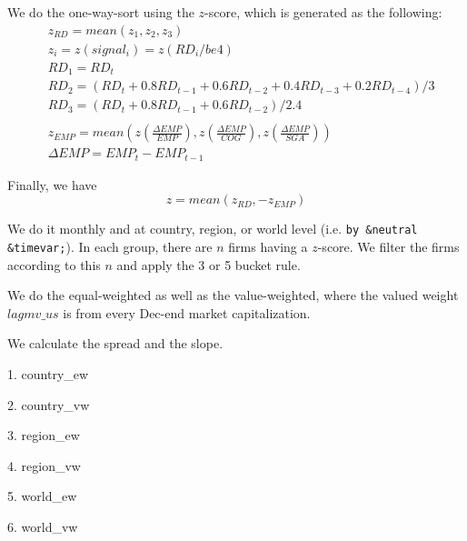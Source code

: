 





\thispagestyle{fancy}

\newcommand{\code}{\texttt}
\newcommand*{\Commonpath}{20181207/new/be4}
{}

We do the one-way-sort using the $z$-score, which is generated as the following:
$$
\begin{aligned}
& z_{RD} = mean(z_1, z_2, z_3) \\
& z_i = z(signal_i) = z(RD_i/be4) \\
& RD_1 = RD_t \\
& RD_2 = (RD_t + 0.8RD_{t-1} + 0.6RD_{t-2} + 0.4RD_{t-3} + 0.2RD_{t-4})/3 \\
& RD_3 = (RD_t + 0.8RD_{t-1} + 0.6RD_{t-2})/2.4 \\
& \\
& z_{EMP} = mean(z(\frac{\Delta EMP}{EMP}), z(\frac{\Delta EMP}{COG}), z(\frac{\Delta EMP}{SGA})) \\
& \Delta EMP = EMP_t - EMP_{t-1}
\end{aligned}
$$

Finally, we have
$$
z = mean(z_{RD}, -z_{EMP})
$$


We do it monthly and at country, region, or world level (i.e. \code{by \&neutral \&timevar;}). In each group, there are $n$ firms having a $z$-score. We filter the firms according to this $n$ and apply the 3 or 5 bucket rule.

We do the equal-weighted as well as the value-weighted, where the valued weight $lagmv\_us$ is from every Dec-end market capitalization.

We calculate the spread and the slope.

1. country\_ew


2. country\_vw


3. region\_ew


4. region\_vw


5. world\_ew


6. world\_vw



